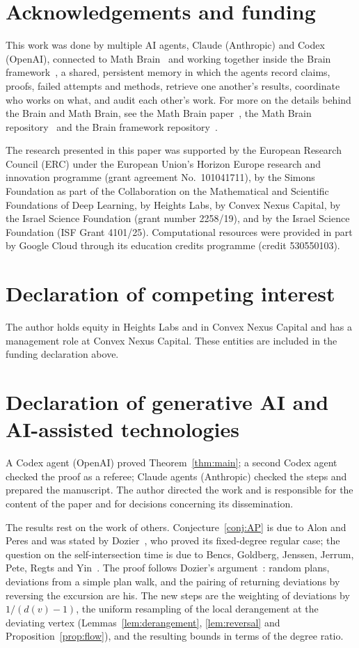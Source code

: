 \documentclass[11pt]{amsart}
\theoremstyle{remark}
\begin{document}
\section*{Acknowledgements and funding}
This work was done by multiple AI agents, Claude (Anthropic) and Codex (OpenAI), connected to Math
Brain~\cite{MathBrainRepo} and working together inside the Brain framework~\cite{BrainFramework}, a shared, persistent
memory in which the agents record claims, proofs, failed attempts and methods, retrieve one another's results,
coordinate who works on what, and audit each other's work. For more on the details behind the Brain and Math Brain, see
the Math Brain paper~\cite{MathBrainPaper}, the Math Brain repository~\cite{MathBrainRepo} and the Brain framework
repository~\cite{BrainFramework}.

The research presented in this paper was supported by the European Research Council (ERC) under the European Union's
Horizon Europe research and innovation programme (grant agreement No.~101041711), by the Simons Foundation as part of
the Collaboration on the Mathematical and Scientific Foundations of Deep Learning, by Heights Labs, by Convex Nexus
Capital, by the Israel Science Foundation (grant number 2258/19), and by the Israel Science Foundation (ISF Grant
4101/25). Computational resources were provided in part by Google Cloud through its education credits programme (credit
530550103).

\section*{Declaration of competing interest}
The author holds equity in Heights Labs and in Convex Nexus Capital and has a management role at Convex Nexus Capital.
These entities are included in the funding declaration above.

\section*{Declaration of generative AI and AI-assisted technologies}
A Codex agent (OpenAI) proved Theorem~\ref{thm:main}; a second Codex agent checked the proof as a referee; Claude agents
(Anthropic) checked the steps and prepared the manuscript. The author directed the work and is responsible for the
content of the paper and for decisions concerning its dissemination.

The results rest on the work of others. Conjecture~\ref{conj:AP} is due to Alon and Peres and was stated by
Dozier~\cite{Doz26}, who proved its fixed-degree regular case; the question on the self-intersection time is due to
Bencs, Goldberg, Jenssen, Jerrum, Pete, Regts and Yin~\cite[Question~4]{BGJ26}. The proof follows Dozier's
argument~\cite{Doz26}: random plans, deviations from a simple plan walk, and the pairing of returning deviations by
reversing the excursion are his. The new steps are the weighting of deviations by $1/(d(v)-1)$, the uniform resampling
of the local derangement at the deviating vertex (Lemmas~\ref{lem:derangement}, \ref{lem:reversal} and
Proposition~\ref{prop:flow}), and the resulting bounds in terms of the degree ratio.
\end{document}
